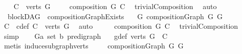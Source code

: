 \begin{isabellebody}
%
\isadelimproof
%
\endisadelimproof
%
\isatagproof
{}\isamarkupfalse%
\isanewline
\ \ \isamarkupfalse%
\ {\isacharquery}{\kern0pt}C\ {\isacharequal}{\kern0pt}\ {\isachardoublequoteopen}verts\ G{\isachardoublequoteclose}\ \isanewline
\ \ \isamarkupfalse%
\ {\isachardoublequoteopen}composition\ G\ {\isacharquery}{\kern0pt}C{\isachardoublequoteclose}\ \isamarkupfalse%
\ trivialComposition\ \isamarkupfalse%
\ auto\ \isanewline
\ \ \isamarkupfalse%
%
\endisatagproof
{\isafoldproof}%
%
\isadelimproof
\isanewline
%
\endisadelimproof
\isanewline
{}\isamarkupfalse%
\ {\isacharparenleft}{\kern0pt}\ blockDAG{\isacharparenright}{\kern0pt}\ \ compositionGraphExists{\isacharcolon}{\kern0pt}\isanewline
\ \ \ {\isachardoublequoteopen}{\isasymexists}G{\isacharprime}{\kern0pt}{\isachardot}{\kern0pt}\ compositionGraph\ G\ G{\isacharprime}{\kern0pt}{\isachardoublequoteclose}\isanewline
%
\isadelimproof
%
\endisadelimproof
%
\isatagproof
{}\isamarkupfalse%
\ {\isacharminus}{\kern0pt}\isanewline
\ \ \isamarkupfalse%
\ C\ \ c{\isacharunderscore}{\kern0pt}def{\isacharcolon}{\kern0pt}\ {\isachardoublequoteopen}C\ {\isacharequal}{\kern0pt}\ verts\ G{\isachardoublequoteclose}\ \isamarkupfalse%
\ auto\isanewline
\ \ \isamarkupfalse%
\ \isamarkupfalse%
\ {\isachardoublequoteopen}composition\ G\ C{\isachardoublequoteclose}\ \isamarkupfalse%
\ trivialComposition\ \isamarkupfalse%
\ simp\isanewline
\ \ \isamarkupfalse%
\ G{\isacharprime}{\kern0pt}{\isacharcolon}{\kern0pt}{\isacharcolon}{\kern0pt}{\isachardoublequoteopen}{\isacharparenleft}{\kern0pt}{\isacharprime}{\kern0pt}a\ set{\isacharcomma}{\kern0pt}\ {\isacharprime}{\kern0pt}b{\isacharparenright}{\kern0pt}\ pre{\isacharunderscore}{\kern0pt}digraph{\isachardoublequoteclose}\isanewline
\ \ \ g{\isacharprime}{\kern0pt}{\isacharunderscore}{\kern0pt}def{\isacharcolon}{\kern0pt}\ {\isachardoublequoteopen}verts\ G{\isacharprime}{\kern0pt}\ {\isacharequal}{\kern0pt}\ {\isacharbraceleft}{\kern0pt}C{\isacharbraceright}{\kern0pt}{\isachardoublequoteclose}\isanewline
\ \ \ \ \isamarkupfalse%
\ {\isacharparenleft}{\kern0pt}metis\ induce{\isacharunderscore}{\kern0pt}subgraph{\isacharunderscore}{\kern0pt}verts{\isacharparenright}{\kern0pt}\ \isanewline
\ \ \isamarkupfalse%
\ {\isachardoublequoteopen}compositionGraph\ G\ G{\isacharprime}{\kern0pt}{\isachardoublequoteclose}\ \isamarkupfalse%

\end{isabellebody}
